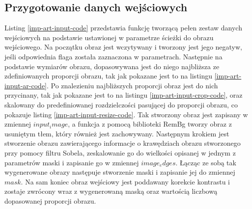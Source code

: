 \documentclass[a4paper, 12pt, polish, twoside]{extreport}
\begin{document}
        \newpage
        \subsection{Przygotowanie danych wejściowych} \label{imp-art-prep-in}
        Listing \ref{imp-art-input-code} przedstawia funkcję tworzącą pełen zestaw danych wejściowych na podstawie ustawionej w parametrze ścieżki do obrazu wejściowego. Na początku obraz jest wczytywany i tworzony jest jego negatyw, jeśli odpowiednia flaga została zaznaczona w parametrach. Następnie na podstawie wymiarów obrazu, dopasowywana jest do niego najbliższa ze zdefiniowanych proporcji obrazu, tak jak pokazane jest to na listingu \ref{imp-art-input-ar-code}. Po znalezieniu najbliższych proporcji obraz jest do nich przycinany, tak jak pokazane jest to na listingu \ref{imp-art-input-crop-code}, oraz skalowany do predefiniowanej rozdzielczości pasującej do proporcji obrazu, co pokazuje listing \ref{imp-art-input-resize-code}. Tak stworzony obraz jest zapisany w zmiennej \(input_image\), a funkcja z pomocą biblioteki RemBg tworzy obraz z usuniętym tłem, który również jest zachowywany. Następnym krokiem jest stworzenie obrazu zawierającego informacje o krawędziach obrazu stworzonego przy pomocy filtru Sobela, zeskalowanie go do wielkości opisanej w jednym z parametrów maski i zapisanie go w zmiennej \(image_edges\). Łącząc ze sobą tak wygenerowane obrazy następuje stworzenie maski i zapisanie jej do zmiennej \(mask\). Na sam koniec obraz wejściowy jest poddawany korekcie kontrastu i zostaje zwrócony wraz z wygenerowaną maską oraz wartością liczbową dopasowanej proporcji obrazu.
\end{document}
